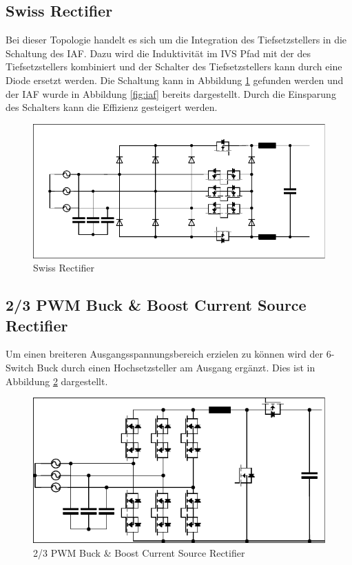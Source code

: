 	\subsection{Swiss Rectifier}
		Bei dieser Topologie handelt es sich um die Integration des Tiefsetzstellers in die Schaltung des \gls{IAF}. Dazu wird die Induktivität im \gls{IVS} Pfad mit der des Tiefsetzstellers kombiniert und der Schalter des Tiefsetzstellers kann durch eine Diode ersetzt werden. Die Schaltung kann in Abbildung \ref{fig:swiss} gefunden werden und der \gls{IAF} wurde in Abbildung \ref{fig:iaf} bereits dargestellt. Durch die Einsparung des Schalters kann die Effizienz gesteigert werden. 
		\begin{figure}[H]
			\centering
			\includegraphics[width=0.9\linewidth]{content/Grafiken/Swiss}
			\caption{Swiss Rectifier}
			\label{fig:swiss}
		\end{figure}
		
	\subsection{2/3 PWM Buck \& Boost Current Source Rectifier}	
		Um einen breiteren Ausgangsspannungsbereich erzielen zu können wird der 6-Switch Buck durch einen Hochsetzsteller am Ausgang ergänzt. Dies ist in Abbildung \ref{fig:23pwmbuckboost} dargestellt. 
		\begin{figure}[H]
			\centering
			\includegraphics[width=0.9\linewidth]{content/Grafiken/23PWMBuckBoost}
			\caption{2/3 PWM Buck \& Boost Current Source Rectifier}
			\label{fig:23pwmbuckboost}
		\end{figure}
